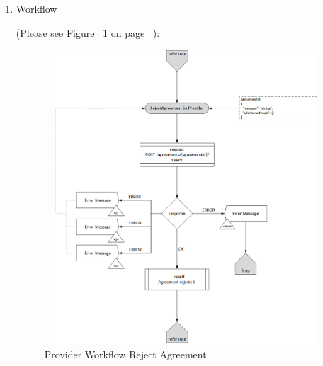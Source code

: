 \begin{enumerate}

\item Workflow

(Please see Figure ~\ref{fig:PRA} on page ~\pageref{fig:PRA}):

\begin{figure}[H]
    \centering
    \includegraphics[width=11cm,height=11cm,angle=0]{./diag/Workflow/Market/RejectAgreement-P-Workflow.png}
    \caption{Provider Workflow Reject Agreement  }
	\label{fig:PRA}
\end{figure}

\end{enumerate}

\newpage

